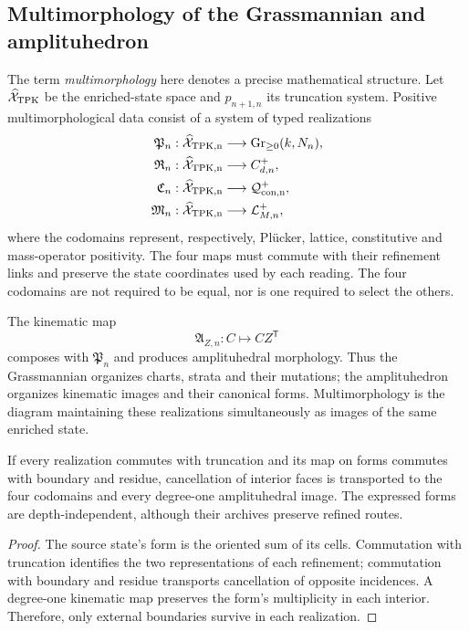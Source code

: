 \subsection{Multimorphology of the Grassmannian and amplituhedron}

The term \emph{multimorphology} here denotes a precise mathematical structure. Let \(\widehat{\mathcal X}_{\rm TPK}\) be the enriched-state space and \(p_{n+1,n}\) its truncation system. Positive multimorphological data consist of a system of typed realizations
\[
\begin{aligned}
\mathfrak P_n&:\widehat{\mathcal X}_{\rm TPK,n}
 \longrightarrow \operatorname{Gr}_{\geq0}(k,N_n),\\
\mathfrak R_n&:\widehat{\mathcal X}_{\rm TPK,n}
 \longrightarrow C^{+}_{d,n},\\
\mathfrak C_n&:\widehat{\mathcal X}_{\rm TPK,n}
 \longrightarrow \mathcal Q^{+}_{\rm con,n},\\
\mathfrak M_n&:\widehat{\mathcal X}_{\rm TPK,n}
 \longrightarrow \mathcal L^{+}_{M,n},
\end{aligned}
\]
where the codomains represent, respectively, Plücker, lattice, constitutive and mass-operator positivity. The four maps must commute with their refinement links and preserve the state coordinates used by each reading. The four codomains are not required to be equal, nor is one required to select the others.

The kinematic map
\[
\mathfrak A_{Z,n}:C\longmapsto CZ^{\mathsf T}
\]
composes with \(\mathfrak P_n\) and produces amplituhedral morphology. Thus the Grassmannian organizes charts, strata and their mutations; the amplituhedron organizes kinematic images and their canonical forms. Multimorphology is the diagram maintaining these realizations simultaneously as images of the same enriched state.

\begin{proposition}
\label{geometria_positiva:prop:coherencia-multimorfologica} If every realization commutes with truncation and its map on forms commutes with boundary and residue, cancellation of interior faces is transported to the four codomains and every degree-one amplituhedral image. The expressed forms are depth-independent, although their archives preserve refined routes.
\end{proposition}
\begin{proof}
The source state's form is the oriented sum of its cells. Commutation with truncation identifies the two representations of each refinement; commutation with boundary and residue transports cancellation of opposite incidences. A degree-one kinematic map preserves the form's multiplicity in each interior. Therefore, only external boundaries survive in each realization.
\end{proof}

